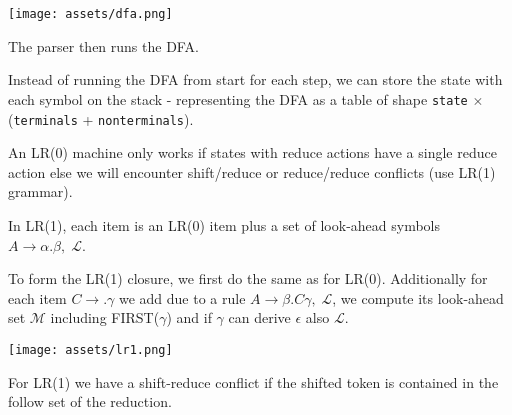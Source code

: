 \begin{center}
	\texttt{[image: assets/dfa.png]}
\end{center}

The parser then runs the DFA.\medskip

Instead of running the DFA from start for each step, we can store the state with each symbol on the stack - representing the DFA as a table of shape \texttt{state} $\times$ (\texttt{terminals} + \texttt{nonterminals}). \medskip

An LR(0) machine only works if states with reduce actions have a single reduce action else we will encounter shift/reduce or reduce/reduce conflicts (use LR(1) grammar). \medskip

In LR(1), each item is an LR(0) item plus a set of look-ahead symbols $A \to \alpha . \beta, \; \mathcal L$.\medskip

To form the LR(1) closure, we first do the same as for LR(0). Additionally for each item $C \to . \gamma$ we add due to a rule $A \to \beta . C \gamma, \; \mathcal L$, we compute its look-ahead set $\mathcal M$ including FIRST($\gamma$) and if $\gamma$ can derive $\epsilon$ also $\mathcal L$. \medskip

\begin{center}
	\texttt{[image: assets/lr1.png]}
\end{center}

For LR(1) we have a shift-reduce conflict if the shifted token is contained in the follow set of the reduction.



